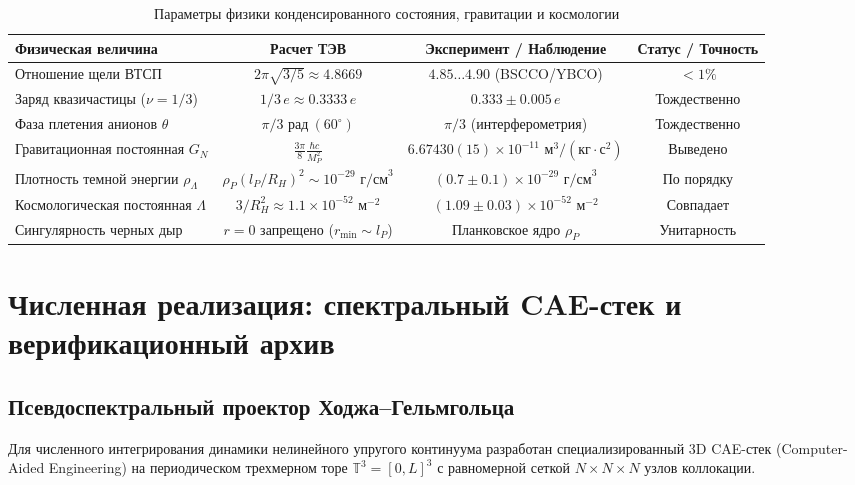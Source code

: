 \documentclass[11pt,a4paper]{article}
\theoremstyle{definition}
\theoremstyle{remark}
\begin{document}
\begin{table}[H]
\centering
\small
\caption{Параметры физики конденсированного состояния, гравитации и космологии}
\label{tab:condensed_cosmo}
\vspace{2mm}
\begin{tabular}{lccc}
\toprule
\textbf{Физическая величина} & \textbf{Расчет ТЭВ} & \textbf{Эксперимент / Наблюдение} & \textbf{Статус / Точность} \\
\midrule
Отношение щели ВТСП & $2\pi\sqrt{3/5} \approx 4.8669$ & $4.85 \dots 4.90$ (BSCCO/YBCO) & $< 1\%$ \\
Заряд квазичастицы ($\nu=1/3$) & $1/3 \, e \approx 0.3333 \, e$ & $0.333 \pm 0.005 \, e$ & Тождественно \\
Фаза плетения анионов $\theta$ & $\pi/3\text{ рад} \ (60^\circ)$ & $\pi/3$ (интерферометрия) & Тождественно \\
\midrule
Гравитационная постоянная $G_N$ & $\frac{3\pi}{8} \frac{\hbar c}{M_P^2}$ & $6.67430(15) \times 10^{-11}\text{ м}^3/(\text{кг}\cdot\text{с}^2)$ & Выведено \\
Плотность темной энергии $\rho_\Lambda$ & $\rho_P (l_P/R_H)^2 \sim 10^{-29}\text{ г/см}^3$ & $(0.7 \pm 0.1) \times 10^{-29}\text{ г/см}^3$ & По порядку \\
Космологическая постоянная $\Lambda$ & $3 / R_H^2 \approx 1.1 \times 10^{-52}\text{ м}^{-2}$ & $(1.09 \pm 0.03) \times 10^{-52}\text{ м}^{-2}$ & Совпадает \\
Сингулярность черных дыр & $r=0$ запрещено ($r_{\min} \sim l_P$) & Планковское ядро $\rho_P$ & Унитарность \\
\bottomrule
\end{tabular}
\end{table}


\section{Численная реализация: спектральный CAE-стек и верификационный архив}
\label{sec:numerical_cae}

\subsection{Псевдоспектральный проектор Ходжа--Гельмгольца}
Для численного интегрирования динамики нелинейного упругого континуума разработан специализированный 3D CAE-стек (Computer-Aided Engineering) на периодическом трехмерном торе $\mathbb{T}^3 = [0, L]^3$ с равномерной сеткой $N \times N \times N$ узлов коллокации.
\end{document}
